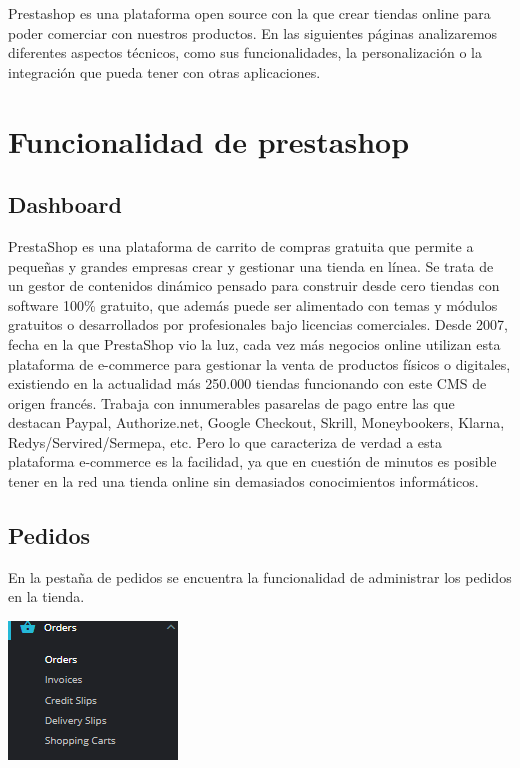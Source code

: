 \documentclass{article}
\begin{document}
Prestashop es una plataforma open source con la que crear tiendas online para poder comerciar con nuestros productos. En las siguientes páginas analizaremos diferentes aspectos técnicos, como sus funcionalidades, la personalización o la integración que pueda tener con otras aplicaciones.

\section{Funcionalidad de prestashop}



\subsection{Dashboard}

PrestaShop es una plataforma de carrito de compras gratuita que permite a pequeñas y grandes empresas crear y gestionar una tienda en línea. Se trata de un gestor de contenidos dinámico pensado para construir desde cero tiendas con software 100\% gratuito, que además puede ser alimentado con temas y módulos gratuitos o desarrollados por profesionales bajo licencias comerciales. Desde 2007, fecha en la que PrestaShop vio la luz, cada vez más negocios online utilizan esta plataforma de e-commerce para gestionar la venta de productos físicos o digitales, existiendo en la actualidad más 250.000 tiendas funcionando con este CMS de origen francés. Trabaja con innumerables pasarelas de pago entre las que destacan Paypal, Authorize.net, Google Checkout, Skrill, Moneybookers, Klarna, Redys/Servired/Sermepa, etc. Pero lo que caracteriza de verdad a esta plataforma e-commerce es la facilidad, ya que en cuestión de minutos es posible tener en la red una tienda online sin demasiados conocimientos informáticos.

\subsection{Pedidos}

En la pestaña de pedidos se encuentra la funcionalidad de administrar los pedidos en la tienda.

\begin{center}
\includegraphics[scale=0.4]{images/pedidos.png}
\end{center}
\end{document}
